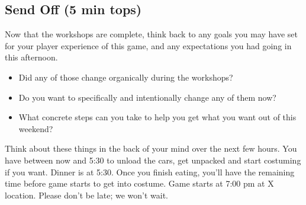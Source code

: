 \documentclass[green]{GL2020}
\begin{document}
\subsection*{Send Off (5 min tops)}
Now that the workshops are complete, think back to any goals you may have set for your player experience of this game, and any expectations you had going in this afternoon. 
\begin{itemize}
	\item Did any of those change organically during the workshops? 
	\item Do you want to specifically and intentionally change any of them now? 
	\item What concrete steps can you take to help you get what you want out of this weekend?
\end{itemize}

Think about these things in the back of your mind over the next few hours. You have between now and 5:30 to unload the cars, get unpacked and start costuming if you want. Dinner is at 5:30. Once you finish eating, you’ll have the remaining time before game starts to get into costume. Game starts at 7:00 pm at X location. Please don’t be late; we won’t wait.
\end{document}
